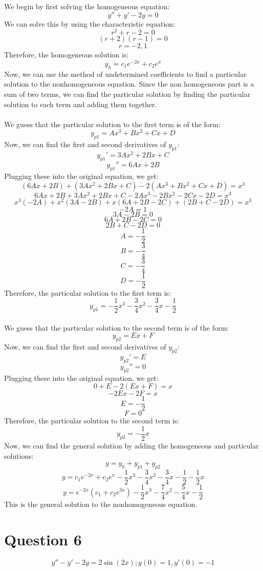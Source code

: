 \documentclass{article}
\begin{document}
We begin by first solving the homogeneous equation:
\[
y'' + y'  - 2y = 0
\]
We can solve this by using the characteristic equation:
\[
r^2 + r - 2 = 0
\]
\[
(r + 2)(r - 1) = 0
\]
\[
r = -2, 1
\]
Therefore, the homogeneous solution is:
\[
y_h = c_1e^{-2x} + c_2e^{x}
\]
Now, we can use the method of undetermined coefficients to find a particular solution to the nonhomogeneous equation. 
Since the non homogeneous part is a sum of two terms, we can find the particular solution by finding the particular solution to each term and adding them together.
\\
\\We guess that the particular solution to the first term is of the form:
\[
y_{p1} = Ax^{3} + Bx^{2} + Cx + D
\]
Now, we can find the first and second derivatives of $y_{p1}$:
\[
y_{p1}' = 3Ax^{2} + 2Bx + C
\]
\[
y_{p1}'' = 6Ax + 2B
\]
Plugging these into the original equation, we get:
\[
(6Ax + 2B) + (3Ax^{2} + 2Bx + C) - 2(Ax^{3} + Bx^{2} + Cx + D) = x^{3}
\]
\[
6Ax + 2B + 3Ax^{2} + 2Bx + C - 2Ax^{3} - 2Bx^{2} - 2Cx - 2D = x^{3}
\]
\[
    x^{3}(-2A) + x^{2}(3A - 2B) + x(6A + 2B - 2C) + (2B + C - 2D) = x^{3}
\]
\[
    -2A = 1
\]
\[
    3A - 2B = 0
\]
\[
    6A + 2B - 2C = 0
\]
\[
    2B + C - 2D = 0
\]
\[
    A = -\frac{1}{2}
\]
\[
    B = -\frac{3}{4}
\]
\[
    C = -\frac{3}{4}
\]
\[
    D = -\frac{1}{2}
\]
Therefore, the particular solution to the first term is:
\[
y_{p1} = -\frac{1}{2}x^{3} - \frac{3}{4}x^{2} - \frac{3}{4}x - \frac{1}{2}
\]
\\We guess that the particular solution to the second term is of the form:
\[
y_{p2} = Ex + F
\]
Now, we can find the first and second derivatives of $y_{p2}$:
\[
y_{p2}' = E
\]
\[
y_{p2}'' = 0
\]
Plugging these into the original equation, we get:
\[
0 + E - 2(Ex + F) = x
\]
\[
    -2Ex - 2F = x
\]
\[
    E = -\frac{1}{2}
\]
\[
    F = 0
\]
Therefore, the particular solution to the second term is:
\[
y_{p2} = -\frac{1}{2}x
\]
Now, we can find the general solution by adding the homogeneous and particular solutions:
\[
y = y_h + y_{p1} + y_{p2}
\]
\[
y = c_1e^{-2x} + c_2e^{x} -\frac{1}{2}x^{3} - \frac{3}{4}x^{2} - \frac{3}{4}x - \frac{1}{2} -\frac{1}{2}x
\]
\[
y = e^{-2x}(c_1 + c_2e^{3x}) -\frac{1}{2}x^{3} - \frac{7}{4}x^{2} - \frac{5}{4}x - \frac{1}{2}
\]
This is the general solution to the nonhomogeneous equation.

\section*{Question 6}
\[
y'' - y' - 2y = 2\sin(2x) ; y(0) = 1, y'(0) = -1
\]
\end{document}
